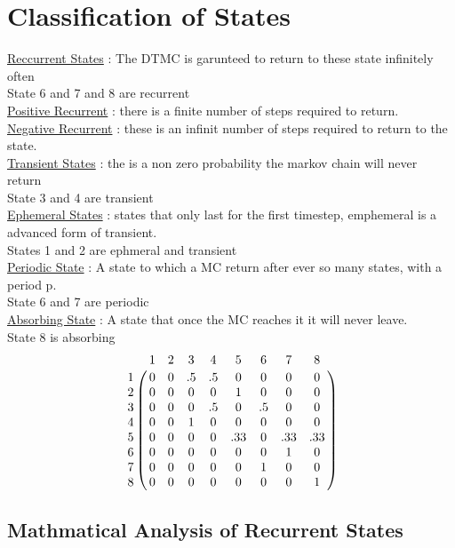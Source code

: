 \documentclass{article}
\begin{document}
    \section{Classification of States}
    \underline{Reccurrent States} : The DTMC is garunteed to return to these state infinitely often
    \\State 6 and 7 and 8 are recurrent
    \\\underline{Positive Recurrent} : there is a finite number of steps required to return. 
    \\\underline{Negative Recurrent} : these is an infinit number of steps required to return to the state. 
    \\\underline{Transient States} : the is a non zero probability the markov chain will never return
    \\State 3 and 4 are transient
    \\\underline{Ephemeral States} : states that only last for the first timestep, emphemeral is a advanced form of transient. 
    \\States 1 and 2 are ephmeral and transient
    \\\underline{Periodic State} : A state to which a MC return after ever so many states, with a period p.
    \\State 6 and 7 are periodic 
    \\\underline{Absorbing State} : A state that once the MC reaches it it will never leave. 
    \\State 8 is absorbing
    \[\bordermatrix{
        & 1 & 2 & 3 & 4 & 5 & 6 & 7 & 8 \cr
      1 & 0 & 0 & .5& .5&0  &0  &0  &0  \cr
      2 & 0 & 0 & 0 & 0 & 1 & 0 & 0 & 0 \cr
      3 & 0 & 0 & 0 & .5& 0 & .5& 0 &0  \cr
      4 & 0 & 0 & 1& 0 & 0 & 0 & 0 & 0 \cr
      5 &0  &0  &0  &0  &.33&0  &.33&.33\cr
      6 & 0 & 0 & 0 & 0 & 0 & 0 & 1 & 0 \cr
      7 &  0&  0&  0& 0 & 0 &  1&0  & 0 \cr
      8 & 0 & 0 & 0 & 0 & 0 & 0 & 0 & 1\cr    
       }\]
   
   	\subsection{Mathmatical Analysis of Recurrent States}
\end{document}
